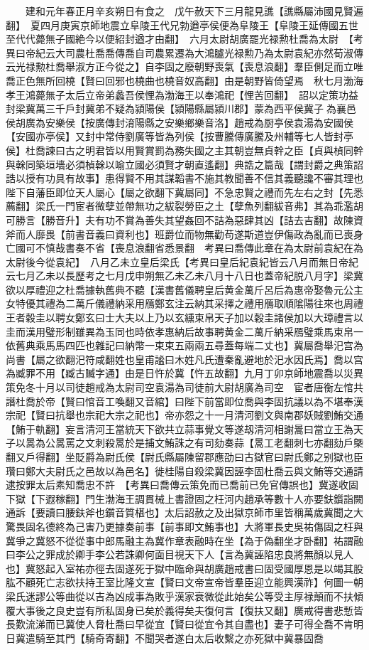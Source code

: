 　　建和元年春正月辛亥朔日有食之　戊午赦天下三月龍見譙【譙縣屬沛國見賢遍翻】　夏四月庚寅京師地震立阜陵王代兄勃遒亭侯便為阜陵王【阜陵王延傳國五世至代代薨無子國絶今以便紹封遒才由翻】　六月太尉胡廣罷光禄勲杜喬為太尉　【考異曰帝紀云大司農杜喬喬傳喬自司農累遷為大鴻臚光禄勲乃為太尉袁紀亦然荀淑傳云光禄勲杜喬舉淑方正今從之】自李固之廢朝野喪氣【喪息浪翻】羣臣側足而立唯喬正色無所回橈【賢曰回邪也橈曲也橈音奴高翻】由是朝野皆倚望焉　秋七月渤海孝王鴻薨無子太后立帝弟蠡吾侯悝為渤海王以奉鴻祀【悝苦回翻】　詔以定策功益封梁冀萬三千戶封冀弟不疑為潁陽侯【潁陽縣屬潁川郡】蒙為西平侯冀子為襄邑侯胡廣為安樂侯【按廣傳封淯陽縣之安樂鄉樂音洛】趙戒為厨亭侯袁湯為安國侯【安國亦亭侯】又封中常侍劉廣等皆為列侯【按曹騰傳廣騰及州輔等七人皆封亭侯】杜喬諫曰古之明君皆以用賢賞罰為務失國之主其朝豈無貞幹之臣【貞與楨同幹與榦同築垣墻必須楨榦以喻立國必須賢才朝直遙翻】典誥之篇哉【謂封爵之典策詔誥以授有功具有故事】患得賢不用其謀韜書不施其教聞善不信其義聽讒不審其理也陛下自藩臣即位天人屬心【屬之欲翻下冀屬同】不急忠賢之禮而先左右之封【先悉薦翻】梁氏一門宦者微孽並帶無功之紱裂勞臣之土【孽魚列翻紱音弗】其為乖濫胡可勝言【勝音升】夫有功不賞為善失其望姦回不詰為惡肆其凶【詰去吉翻】故陳資斧而人靡畏【前書音義曰資利也】班爵位而物無勸苟遂斯道豈伊傷政為亂而已喪身亡國可不慎哉書奏不省【喪息浪翻省悉景翻　考異曰喬傳此章在為太尉前袁紀在為太尉後今從袁紀】　八月乙未立皇后梁氏【考異曰皇后紀袁紀皆云八月而無日帝紀云七月乙未以長歷考之七月戊申朔無乙未乙未八月十八日也蓋帝紀脱八月字】梁冀欲以厚禮迎之杜喬據執舊典不聽【漢書舊儀聘皇后黄金萬斤呂后為惠帝娶魯元公主女特優其禮為二萬斤儀禮納采用鴈鄭玄注云納其采擇之禮用鴈取順隂陽往來也周禮王者穀圭以聘女鄭玄曰士大夫以上乃以玄纁束帛天子加以穀圭諸侯加以大璋禮言以圭而漢用璧形制雖異為玉同也時依孝惠納后故事聘黄金二萬斤納采鴈璧乘馬束帛一依舊典乘馬馬四匹也雜記曰納幣一束束五兩兩五尋蓋每端二丈也】冀屬喬舉汜宫為尚書【屬之欲翻汜符咸翻姓也皇甫謐曰木姓凡氏遭秦亂避地於汜水因氏焉】喬以宫為臧罪不用【臧古贓字通】由是日忤於冀【忤五故翻】九月丁卯京師地震喬以災異策免冬十月以司徒趙戒為太尉司空袁湯為司徒前大尉胡廣為司空　宦者唐衡左悺共譖杜喬於帝【賢曰悺音工喚翻又音綰】曰陛下前當即位喬與李固抗議以為不堪奉漢宗祀【賢曰抗舉也宗祀大宗之祀也】帝亦怨之十一月清河劉文與南郡妖賊劉鮪交通【鮪于軌翻】妄言清河王當統天下欲共立蒜事覺文等遂刼清河相謝暠曰當立王為天子以暠為公暠罵之文刺殺暠於是捕文鮪誅之有司劾奏蒜【暠工老翻刺七亦翻劾戶槩翻又戶得翻】坐貶爵為尉氏侯【尉氏縣屬陳留郡應劭曰古獄官曰尉氏鄭之别獄也臣瓚曰鄭大夫尉氏之邑故以為邑名】徙桂陽自殺梁冀因誣李固杜喬云與文鮪等交通請逮按罪太后素知喬忠不許　【考異曰喬傳云策免而已喬前已免官傳誤也】冀遂收固下獄【下遐稼翻】門生渤海王調貫械上書證固之枉河内趙承等數十人亦要鈇鑕詣闕通訴【要讀曰腰鈇斧也鑕音質椹也】太后詔赦之及出獄京師市里皆稱萬歲冀聞之大驚畏固名德終為己害乃更據奏前事【前事即文鮪事也】大將軍長史吳祐傷固之枉與冀爭之冀怒不從從事中郎馬融主為冀作章表融時在坐【為于偽翻坐才卧翻】祐謂融曰李公之罪成於卿手李公若誅卿何面目視天下人【言為冀誣陷忠良將無顏以見人也】冀怒起入室祐亦徑去固遂死于獄中臨命與胡廣趙戒書曰固受國厚恩是以竭其股肱不顧死亡志欲扶持王室比隆文宣【賢曰文帝宣帝皆羣臣迎立能興漢祚】何圖一朝梁氏迷謬公等曲從以吉為凶成事為敗乎漢家衰微從此始矣公等受主厚禄顛而不扶傾覆大事後之良史豈有所私固身已矣於義得矣夫復何言【復扶又翻】廣戒得書悲慙皆長歎流涕而已冀使人脅杜喬曰早從宜【賢曰從宜令其自盡也】妻子可得全喬不肯明日冀遣騎至其門【騎奇寄翻】不聞哭者遂白太后收繫之亦死獄中冀暴固喬